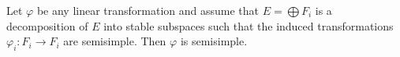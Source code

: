 Let $\varphi$ be any linear transformation and assume that $E = \bigoplus F_i$ is a decomposition of $E$ into stable subspaces such that the induced transformations $\varphi_i: F_i \rightarrow F_i$ are semisimple. Then $\varphi$ is semisimple.
